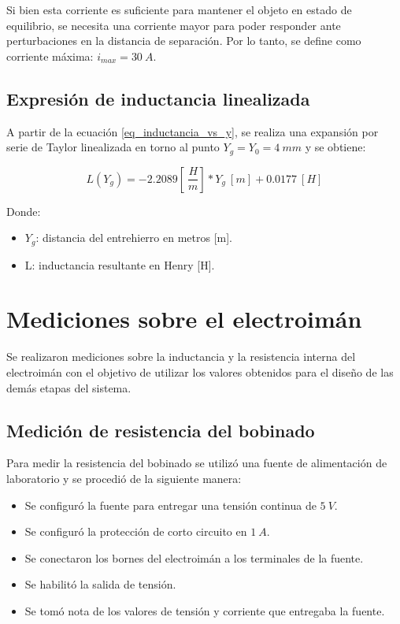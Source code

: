 \noindent Si bien esta corriente es suficiente para mantener el objeto en estado de equilibrio, se necesita una corriente mayor para poder responder ante perturbaciones en la distancia de separación. Por lo tanto, se define como corriente máxima: $i_{max}=30\:A$.


\subsection{Expresión de inductancia linealizada}
\label{secc_exp_ind_linealizada}
\noindent A partir de la ecuación \ref{eq_inductancia_vs_y}, se realiza una expansión por serie de Taylor linealizada en torno al punto $Y_{g}=Y_{0}=4\:mm$ y se obtiene:

\begin{equation} \label{eq_inductancia_lineal_teorica}
	L(Y_{g})=-2.2089[\:\frac{H}{m}]*Y_{g}\:[m]+0.0177\:[H]
\end{equation}

\noindent Donde:
\begin{itemize}
	\item $Y_{g}$: distancia del entrehierro en metros [m].
	\item L: inductancia resultante en Henry [H].
\end{itemize}

\section{Mediciones sobre el electroimán}

\noindent Se realizaron mediciones sobre la inductancia y la resistencia interna del electroimán con el objetivo de utilizar los valores obtenidos para el diseño de las demás etapas del sistema.

\subsection{Medición de resistencia del bobinado}

\noindent Para medir la resistencia del bobinado se utilizó una fuente de alimentación de laboratorio y se procedió de la siguiente manera:

\begin{itemize}
	\item Se configuró la fuente para entregar una tensión continua de $5\:V$.
	\item Se configuró la protección de corto circuito en $1\:A$.
	\item Se conectaron los bornes del electroimán a los terminales de la fuente.
	\item Se habilitó la salida de tensión.
	\item Se tomó nota de los valores de tensión y corriente que entregaba la fuente.
\end{itemize}

